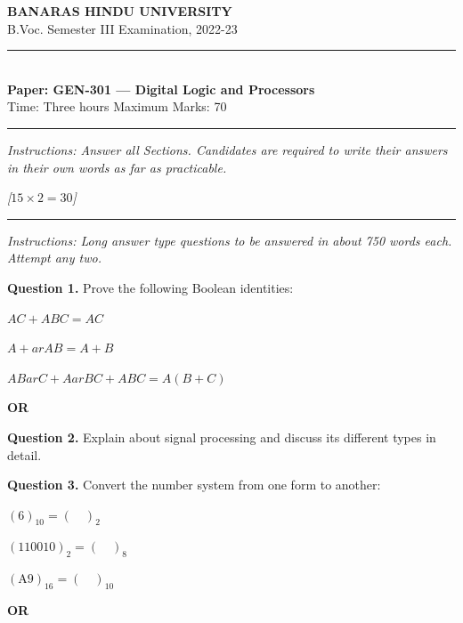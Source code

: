 \documentclass[11pt,a4paper]{article}
\newcommand{\pts}[1]{\hfill   \textit{[#1]}}
\begin{document}
\begin{center}
  {\large\bfseries BANARAS HINDU UNIVERSITY}\\[2pt]
  {\normalsize B.Voc. Semester III Examination, 2022-23}\\[6pt]
  \rule{0.8\linewidth}{0.5pt}\\[6pt]
  {\large\bfseries Paper: GEN-301 --- Digital Logic and Processors}\\[4pt]
  {\normalsize Time: Three hours \hfill Maximum Marks: 70}
\end{center}

\rule{\linewidth}{0.4pt}

\smallskip



\noindent   \textit{Instructions: Answer all Sections. Candidates are required to write their answers in their own words as far as practicable.}

\bigskip

\bigskip


\pts{$15  \times 2 = 30$}
\rule{\linewidth}{0.4pt}\smallskip




\noindent   \textit{Instructions: Long answer type questions to be answered in about 750 words each. Attempt any two.}

\medskip


\noindent   \textbf{Question 1.} Prove the following Boolean identities:

\begin{parts}
  \item $A C + A B C = A C$
  \item $A + ar{A} B = A + B$
  \item $A B ar{C} + A ar{B} C + A B C = A(B + C)$
\end{parts}
\centerline{   \textbf{OR}}

\medskip


\noindent   \textbf{Question 2.} Explain about signal processing and discuss its different types in detail.

\medskip


\noindent   \textbf{Question 3.} Convert the number system from one form to another:

\begin{parts}
  \item $(6)_{10} = ( \quad )_2$
  \item $(110010)_2 = ( \quad )_8$
  \item $( \text{A9})_{16} = ( \quad )_{10}$
\end{parts}
\centerline{   \textbf{OR}}
\end{document}

